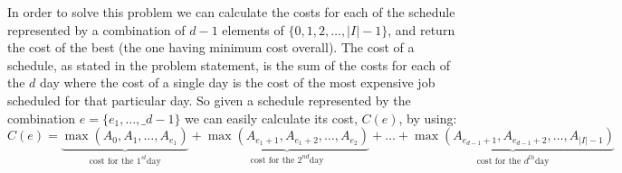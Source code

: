 In order to solve this problem we can calculate the costs for each of the schedule represented by a
combination of $d-1$ elements of $\{0,1,2, \ldots, |I|-1\}$, and return the cost of the best (the
one having minimum cost overall). The cost of a schedule, as stated in the problem statement, is the
sum of the costs for each of the $d$ day where the cost of a single day is the cost of the most
expensive job scheduled for that particular day. So given a schedule represented by the combination
$e = \{e_1, \ldots, \_{d-1}\}$ we can easily calculate its cost, $C(e)$, by using:
\begin{equation}
    C(e) = \underbrace{\max(A_0, A_1, \ldots, A_{e_1})}_{\text{cost for the } 1^{st} \text{day}} + \underbrace{\max(A_{e_1+1}, A_{e_1+2}, \ldots, A_{e_2})}_{\text{cost for the } 2^{nd} \text{day}} + \ldots + \underbrace{\max(A_{e_{d-1}+1}, A_{e_{d-1}+2}, \ldots, A_{|I|-1})}_{\text{cost for the } d^{th} \text{day}}
    \label{eq:min_difficulty_job_scheduler:cost_combination}
\end{equation}


